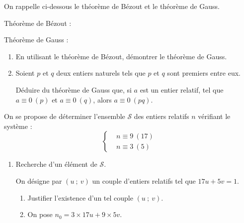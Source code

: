 \documentclass{cornouaille}
\begin{document}

\begin{exercice}


On rappelle ci-dessous le théorème de Bézout et le théorème de Gauss.

Théorème de Bézout :

 \fg 

Théorème de Gauss :

 \fg 

\begin{enumerate}
\item En utilisant le théorème de Bézout, démontrer le théorème de Gauss.

\item Soient $p$ et $q$ deux entiers naturels tels que $p$ et $q$ sont premiers entre eux.

Déduire du théorème de Gauss que, si $a$ est un entier relatif, tel que $a\equiv0~(p)$ et $a\equiv0~(q)$, alors $a\equiv0~(pq)$.
\end{enumerate}\medskip

\partie{}

On se propose de déterminer l'ensemble $\mathcal{S}$ des entiers relatifs $n$ vérifiant le système :
$$\left\{\begin{aligned}
				&n\equiv9~(17)\\
				&n\equiv3~(5)\end{aligned}\right.$$
\begin{enumerate}			
\item Recherche d'un élément de $\mathcal{S}$.

On désigne par $(u\ ;\ v)$ un couple d'entiers relatifs tel que $17u+5v=1$.
\begin{enumerate}
\item Justifier l'existence d'un tel couple $(u\ ;\ v)$.

\item On pose $n_0=3\times17u+9\times5v$.


\end{enumerate}
\end{enumerate}
\end{exercice}
\end{document}
